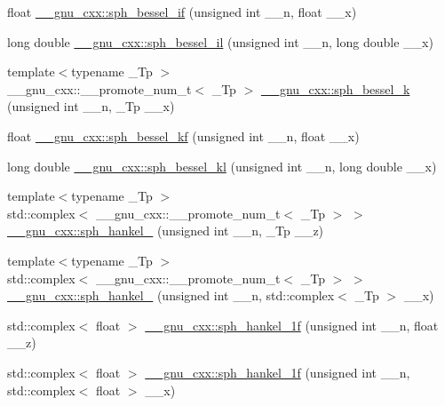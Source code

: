 \begin{DoxyCompactItemize}
\item 
float \hyperlink{group__gnu__math__spec__func_gacc6738f18c1ba19452b9dd814d11c00c}{\+\_\+\+\_\+gnu\+\_\+cxx\+::sph\+\_\+bessel\+\_\+if} (unsigned int \+\_\+\+\_\+n, float \+\_\+\+\_\+x)
\item 
long double \hyperlink{group__gnu__math__spec__func_gaf4392d9ed177913febdcbfccb947dbca}{\+\_\+\+\_\+gnu\+\_\+cxx\+::sph\+\_\+bessel\+\_\+il} (unsigned int \+\_\+\+\_\+n, long double \+\_\+\+\_\+x)
\item 
{\footnotesize template$<$typename \+\_\+\+Tp $>$ }\\\+\_\+\+\_\+gnu\+\_\+cxx\+::\+\_\+\+\_\+promote\+\_\+num\+\_\+t$<$ \+\_\+\+Tp $>$ \hyperlink{group__gnu__math__spec__func_ga737e6fe2f7f4acb6fcc6bccfe2a4c254}{\+\_\+\+\_\+gnu\+\_\+cxx\+::sph\+\_\+bessel\+\_\+k} (unsigned int \+\_\+\+\_\+n, \+\_\+\+Tp \+\_\+\+\_\+x)
\item 
float \hyperlink{group__gnu__math__spec__func_gaf886e8f8dfd2af0c4a9c5929d193d12f}{\+\_\+\+\_\+gnu\+\_\+cxx\+::sph\+\_\+bessel\+\_\+kf} (unsigned int \+\_\+\+\_\+n, float \+\_\+\+\_\+x)
\item 
long double \hyperlink{group__gnu__math__spec__func_ga22f6a73e50e7020a7c2fa64ce1b9be41}{\+\_\+\+\_\+gnu\+\_\+cxx\+::sph\+\_\+bessel\+\_\+kl} (unsigned int \+\_\+\+\_\+n, long double \+\_\+\+\_\+x)
\item 
{\footnotesize template$<$typename \+\_\+\+Tp $>$ }\\std\+::complex$<$ \+\_\+\+\_\+gnu\+\_\+cxx\+::\+\_\+\+\_\+promote\+\_\+num\+\_\+t$<$ \+\_\+\+Tp $>$ $>$ \hyperlink{group__gnu__math__spec__func_ga9440f3f92ebc56bd77d64853390247f6}{\+\_\+\+\_\+gnu\+\_\+cxx\+::sph\+\_\+hankel\+\_} (unsigned int \+\_\+\+\_\+n, \+\_\+\+Tp \+\_\+\+\_\+z)
\item 
{\footnotesize template$<$typename \+\_\+\+Tp $>$ }\\std\+::complex$<$ \+\_\+\+\_\+gnu\+\_\+cxx\+::\+\_\+\+\_\+promote\+\_\+num\+\_\+t$<$ \+\_\+\+Tp $>$ $>$ \hyperlink{group__gnu__math__spec__func_ga0bf6e485b5ec9d1ae4ab604137216d70}{\+\_\+\+\_\+gnu\+\_\+cxx\+::sph\+\_\+hankel\+\_} (unsigned int \+\_\+\+\_\+n, std\+::complex$<$ \+\_\+\+Tp $>$ \+\_\+\+\_\+x)
\item 
std\+::complex$<$ float $>$ \hyperlink{group__gnu__math__spec__func_ga70d4fc01069f3f0ac0e3b52fe1dffea4}{\+\_\+\+\_\+gnu\+\_\+cxx\+::sph\+\_\+hankel\+\_\+1f} (unsigned int \+\_\+\+\_\+n, float \+\_\+\+\_\+z)
\item 
std\+::complex$<$ float $>$ \hyperlink{group__gnu__math__spec__func_gadbb875cd50abb62ac75386143486bb2c}{\+\_\+\+\_\+gnu\+\_\+cxx\+::sph\+\_\+hankel\+\_\+1f} (unsigned int \+\_\+\+\_\+n, std\+::complex$<$ float $>$ \+\_\+\+\_\+x)

\end{DoxyCompactItemize}
